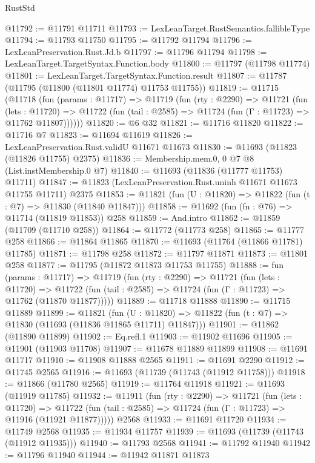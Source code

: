 \begin{lexlean}{RustStd}
\begin{coremodule}
@11792 := @11791 @11711
@11793 := LexLeanTarget.RustSemantics.fallibleType
@11794 := @11793 @11750
@11795 := @11792 @11794
@11796 := LexLeanPreservation.Rust.Jd.b
@11797 := @11796 @11794
@11798 := LexLeanTarget.TargetSyntax.Function.body
@11800 := @11797 (@11798 @11774)
@11801 := LexLeanTarget.TargetSyntax.Function.result
@11807 := @11787 (@11795 (@11800 (@11801 @11774) @11753 @11755))
@11819 := @11715
    (@11718
      (fun (params : @11717) =>
      @11719
        (fun (rty : @2290) =>
        @11721
          (fun (lets : @11720) =>
          @11722 (fun (tail : @2585) => @11724 (fun (Γ : @11723) => @11762 @11807))))))
@11820 := @6 @32
@11821 := @11716 @11820
@11822 := @11716 @7
@11823 := @11694 @11619
@11826 := LexLeanPreservation.Rust.validU @11671 @11673
@11830 := @11693 (@11823 (@11826 @11755) @2375)
@11836 := Membership.mem.{0, 0} @7 @8 (List.instMembership.{0} @7)
@11840 := @11693 (@11836 (@11777 @11753) @11711)
@11847 := @11823 (LexLeanPreservation.Rust.uninh @11671 @11673 @11755 @11711) @2375
@11853 := @11821 (fun (U : @11820) => @11822 (fun (t : @7) => @11830 (@11840 @11847)))
@11858 := @11692 (fun (fn : @76) => @11714 (@11819 @11853)) @258
@11859 := And.intro
@11862 := @11859 (@11709 (@11710 @258))
@11864 := @11772 (@11773 @258)
@11865 := @11777 @258
@11866 := @11864 @11865
@11870 := @11693 (@11764 (@11866 @11781) @11785)
@11871 := @11798 @258
@11872 := @11797 @11871
@11873 := @11801 @258
@11877 := @11795 (@11872 @11873 @11753 @11755)
@11888 := fun (params : @11717) =>
  @11719
    (fun (rty : @2290) =>
    @11721
      (fun (lets : @11720) =>
      @11722 (fun (tail : @2585) => @11724 (fun (Γ : @11723) => @11762 (@11870 @11877)))))
@11889 := @11718 @11888
@11890 := @11715 @11889
@11899 := @11821
    (fun (U : @11820) => @11822 (fun (t : @7) => @11830 (@11693 (@11836 @11865 @11711) @11847)))
@11901 := @11862 (@11890 @11899)
@11902 := Eq.refl.{1}
@11903 := @11902 @11696
@11905 := @11901 (@11903 @11708)
@11907 := @11678 @11889 @11899
@11908 := @11691 @11717
@11910 := @11908 @11888 @2565
@11911 := @11691 @2290
@11912 := @11745 @2565
@11916 := @11693 (@11739 (@11743 (@11912 @11758)))
@11918 := @11866 (@11780 @2565)
@11919 := @11764 @11918
@11921 := @11693 (@11919 @11785)
@11932 := @11911
    (fun (rty : @2290) =>
    @11721
      (fun (lets : @11720) =>
      @11722 (fun (tail : @2585) => @11724 (fun (Γ : @11723) => @11916 (@11921 @11877)))))
    @2568
@11933 := @11691 @11720
@11934 := @11749 @2568
@11935 := @11934 @11757
@11939 := @11693 (@11739 (@11743 (@11912 @11935)))
@11940 := @11793 @2568
@11941 := @11792 @11940
@11942 := @11796 @11940
@11944 := @11942 @11871 @11873

\end{coremodule}
\end{lexlean}

